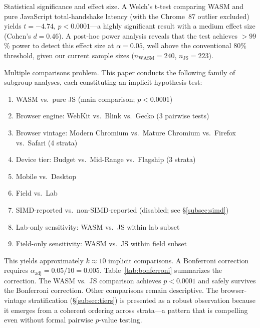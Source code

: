 \documentclass[11pt,a4paper]{article}
\def\textbf#1{#1}%
\begin{document}
\textbf{Statistical significance and effect size.} A Welch's t-test comparing WASM and pure JavaScript total-handshake latency (with the Chrome~87 outlier excluded) yields $t=-4.74$, $p < 0.0001$---a highly significant result with a medium effect size (Cohen's $d = 0.46$). A post-hoc power analysis reveals that the test achieves $>99$\% power to detect this effect size at $\alpha=0.05$, well above the conventional 80\% threshold, given our current sample sizes ($n_{\text{WASM}}=240$, $n_{\text{JS}}=223$).

\textbf{Multiple comparisons problem.} This paper conducts the following family of subgroup analyses, each constituting an implicit hypothesis test:
\begin{enumerate}
    \item WASM vs.\ pure JS (main comparison; $p < 0.0001$)
    \item Browser engine: WebKit vs.\ Blink vs.\ Gecko (3 pairwise tests)
    \item Browser vintage: Modern Chromium vs.\ Mature Chromium vs.\ Firefox vs.\ Safari (4 strata)
    \item Device tier: Budget vs.\ Mid-Range vs.\ Flagship (3 strata)
    \item Mobile vs.\ Desktop
    \item Field vs.\ Lab
    \item SIMD-reported vs.\ non-SIMD-reported (disabled; see \S\ref{subsec:simd})
    \item Lab-only sensitivity: WASM vs.\ JS within lab subset
    \item Field-only sensitivity: WASM vs.\ JS within field subset
\end{enumerate}
This yields approximately $k \approx 10$ implicit comparisons. A Bonferroni correction requires $\alpha_{\text{adj}} = 0.05 / 10 = 0.005$. Table~\ref{tab:bonferroni} summarizes the correction. \textbf{The WASM vs.\ JS comparison achieves $p < 0.0001$ and safely survives the Bonferroni correction.} Other comparisons remain descriptive. The browser-vintage stratification (\S\ref{subsec:tiers}) is presented as a robust observation because it emerges from a coherent ordering across strata---a pattern that is compelling even without formal pairwise $p$-value testing.
\end{document}
